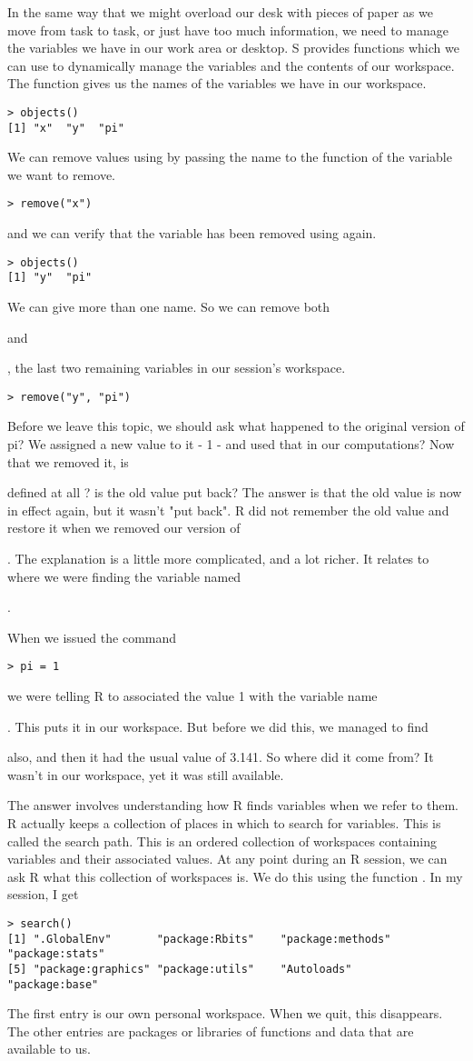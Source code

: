 {{{{ In the same way that we might overload our desk with pieces of paper as we move from task to task, or just have too much information, we need to manage the variables we have in our work area or desktop. S provides functions which we can use to dynamically manage the variables and the contents of our workspace. The function  gives us the names of the variables we have in our workspace. 
\begin{verbatim}
> objects()
[1] "x"  "y"  "pi"
\end{verbatim}
 We can remove values using  by passing the name to the function of the variable we want to remove. 
\begin{verbatim}
> remove("x")  
\end{verbatim}
 and we can verify that the variable has been removed using  again. 
\begin{verbatim}
> objects()
[1] "y"  "pi"
\end{verbatim}
 We can give more than one name. So we can remove both { and {, the last two remaining variables in our session's workspace. 
\begin{verbatim}
> remove("y", "pi")
\end{verbatim}
 Before we leave this topic, we should ask what happened to the original version of pi? We assigned a new value to it - 1 - and used that in our computations? Now that we removed it, is { defined at all ? is the old value put back? The answer is that the old value is now in effect again, but it wasn't "put back". R did not remember the old value and restore it when we removed our version of {. The explanation is a little more complicated, and a lot richer. It relates to where we were finding the variable named {. 

 When we issued the command 
\begin{verbatim}
> pi = 1
\end{verbatim}
 we were telling R to associated the value 1 with the variable name {. This puts it in our workspace. But before we did this, we managed to find { also, and then it had the usual value of 3.141. So where did it come from? It wasn't in our workspace, yet it was still available. 

 The answer involves understanding how R finds variables when we refer to them. R actually keeps a collection of places in which to search for variables. This is called the search path. This is an ordered collection of workspaces containing variables and their associated values. At any point during an R session, we can ask R what this collection of workspaces is. We do this using the function . In my session, I get 
\begin{verbatim}
> search()
[1] ".GlobalEnv"       "package:Rbits"    "package:methods"  "package:stats"   
[5] "package:graphics" "package:utils"    "Autoloads"        "package:base"    
\end{verbatim}
 The first entry is our own personal workspace. When we quit, this disappears. The other entries are packages or libraries of functions and data that are available to us. 

}}}}}}}}}}}
